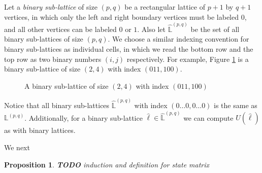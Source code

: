 \documentclass[12pt]{article}
\theoremstyle{plain}
\newtheorem{prop}[thm]{Proposition}
\theoremstyle{definition}
\theoremstyle{remark}
\theoremstyle{definition}
\newcommand{\cell}[4]{ \draw[thick] ( #1 , #2 ) rectangle ( #3 , #4 );}
\newcommand{\lablvertex}[3]{\node[shape=circle,draw=none,fill=white, inner sep=2pt,minimum size=5pt] (A) at ( #1 , #2 ) {#3};}
\begin{document}
Let a \textit{binary sub-lattice} of size $(p,q)$ be a rectangular lattice of $p+1$ by $q+1$ vertices, in which only the left and right boundary vertices must be labeled $0$, and all other vertices can be labeled $0$ or $1$. Also let $\hat{\mathbb{L}}^{(p,q)}$ be the set of all binary sub-lattices of size $(p,q)$. We choose a similar indexing convention for binary sub-lattices as individual cells, in which we read the bottom row and the top row as two binary numbers $(i,j)$ respectively. For example, Figure \ref{fig:binary sub lattice example} is a binary sub-lattice of size $(2,4)$ with index $(011,100)$.

\begin{figure}[h!]
    \begin{center}
    \end{center}
\caption{A binary sub-lattice of size $(2,4)$ with index $(011,100)$}
\label{fig:binary sub lattice example}
\end{figure}

Notice that all binary sub-lattices $\hat{\mathbb{L}}^{(p,q)}$ with index $(0\dots0,0\dots0)$ is the same as $\mathbb{L}^{(p,q)}$. Additionally, for a binary sub-lattice $\hat{\ell} \in \hat{\mathbb{L}}^{(p,q)}$ we can compute $U(\hat{\ell})$ as with binary lattices.

We next 

\begin{prop}
    \textbf{TODO} induction and definition for state matrix
\end{prop}
\end{document}
